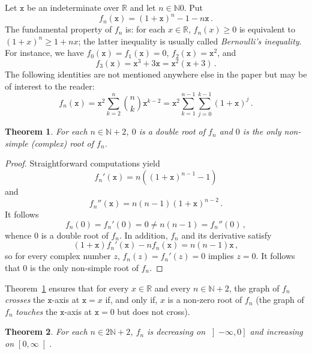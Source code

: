 \documentclass[12pt]{article}
\newcommand{\bR}{\mathbb{R}}
\newcommand{\bN}{\mathbb{N}}
\newcommand{\geint}[1]{\left[ #1, \infty \right[}
\newcommand{\leint}[1]{\left]- \infty, #1 \right]}
\newcommand{\ttx}{\mathtt{x}}
\newtheorem{theorem}{Theorem}
\begin{document}
\sloppy

Let $\ttx$ be an indeterminate over $\bR$ and let $n \in \bN{0}$.
Put
$$
f_n(\ttx) = {(1 + \ttx)}^n - 1 - n \ttx \, .
$$
The fundamental property of $f_n$ is:
for each $x \in \bR$, $f_n(x) \ge 0$ is equivalent to ${(1 + x)}^n \ge 1 + n x$; 
the latter inequality is usually called \emph{Bernoulli's inequality}.
For instance, we have 
$f_0(\ttx) = f_1(\ttx) = 0$,
$f_2(\ttx) = \ttx^2$, and
\begin{equation} \label{eq:f3-t3}
f_3(\ttx) = \ttx^3 + 3 \ttx = \ttx^2 (\ttx + 3) \,.
\end{equation}
 The following identities are not mentioned anywhere else in the paper but may be of interest to the reader:
 $$
 f_n (\ttx)
 = \ttx^2 \sum_{k = 2}^n \binom{n}{k} \ttx^{k - 2}
 = \ttx^2 \sum_{k = 1}^{n - 1}  \sum_{j = 0}^{k - 1} {(1 + \ttx)}^j \, .  
 $$

\begin{theorem} \label{thm:root-mult}
  For each $n \in \bN + 2$,
  $0$ is a double root of $f_n$ and $0$ is the only non-simple (complex) root of $f_n$.
\end{theorem}

\begin{proof}
  Straightforward computations yield
  \begin{equation} \label{eq:deriv-fn} 
  f_n'(\ttx)  = n \left( {(1 + \ttx)}^{n - 1} -  1 \right) 
  \end{equation}
  and
  $$
  f_n''(\ttx)  = n (n - 1) {(1 + \ttx)}^{n - 2} \,.
  $$
  It follows
  $$
  f_n(0) = f_n'(0) = 0 \ne n (n - 1) = f_n''(0) \, ,
  $$
  whence $0$ is a double root of $f_n$.
  In addition, $f_n$ and its derivative satisfy 
   $$
   (1 + \ttx) f_n'(\ttx) - n f_n(\ttx) = n (n - 1) \ttx \, ,
   $$
   so for every complex number $z$, $f_n(z) = f_n'(z) = 0$ implies $z = 0$.
   It follows that $0$ is the only non-simple root of $f_n$.
 \end{proof}
 
Theorem~\ref{thm:root-mult} ensures that for every $x \in \bR$ and every $n \in \bN + 2$,
the graph of $f_n$ \emph{crosses} the $\ttx$-axis at $\ttx = x$ if, and only if, $x$ is a non-zero root of $f_n$
(the graph of $f_n$ \emph{touches} the $\ttx$-axis at $\ttx = 0$ but does not cross).



 \begin{theorem} \label{thm:variation-even}
   For each $n \in 2 \bN + 2$,
   $f_n$ is
   decreasing on $\leint{0}$ and
   increasing on $\geint{0}$.
 \end{theorem}
\end{document}
